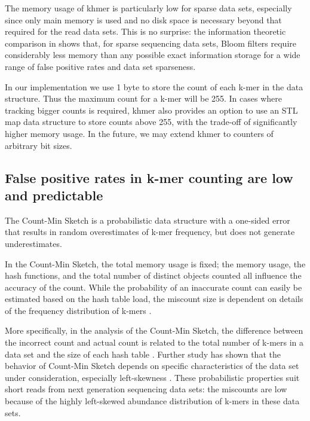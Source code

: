 \documentclass[10pt]{article}
\begin{document}
The memory usage of khmer is particularly low for sparse data sets,
especially since only main memory is used and no disk space is
necessary beyond that required for the read data sets.  This is no
surprise: the information theoretic comparison in \cite{Pell2012}
shows that, for sparse sequencing data sets, Bloom filters require
considerably less memory than any possible exact information storage
for a wide range of false positive rates and data set sparseness.

In our implementation we use 1 byte to store the count of each k-mer
in the data structure. Thus the maximum count for a k-mer will be 255.
In cases where tracking bigger counts is required, khmer also provides
an option to use an STL map data structure to store counts above 255,
with the trade-off of significantly higher memory usage.  In the
future, we may extend khmer to counters of arbitrary bit sizes.


\subsection*{False positive rates in k-mer counting are low and predictable}

The Count-Min Sketch is a probabilistic data structure with a one-sided
error that results in random overestimates of k-mer frequency, but
does not generate underestimates.

In the Count-Min Sketch, the total memory usage is fixed; the memory
usage, the hash functions, and the total number of distinct objects
counted all influence the accuracy of the count.  While the
probability of an inaccurate count can easily be estimated based on
the hash table load, the miscount size is dependent on details of the
frequency distribution of k-mers \cite{Cormode2005}.

More specifically, in the analysis of the Count-Min Sketch, the
difference between the incorrect count and actual count is related to
the total number of k-mers in a data set and the size of each hash
table \cite{Cormode2005}. Further study has shown that the behavior of
Count-Min Sketch depends on specific characteristics of the data set
under consideration, especially left-skewness \cite{Rusu2008,
  CormodeM05}.  These probabilistic properties suit short reads from
next generation sequencing data sets: the miscounts are low because of
the highly left-skewed abundance distribution of k-mers in these data
sets.
\end{document}
